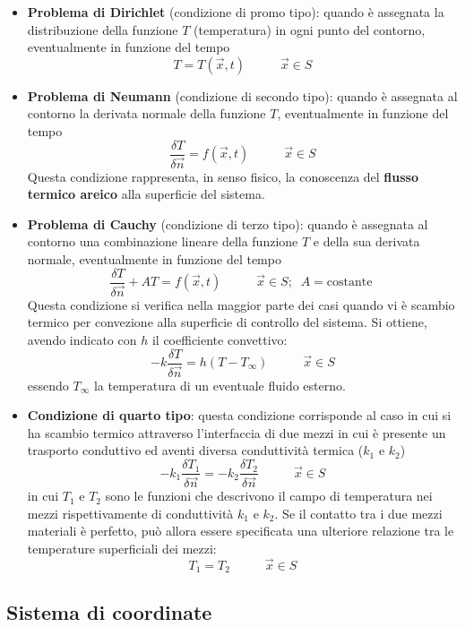 \begin{itemize}
    \item \textbf{Problema di Dirichlet} (condizione di promo tipo): quando è assegnata la distribuzione della funzione $T$ (temperatura) in ogni punto del contorno, eventualmente in funzione del tempo
    \[
        T = T(\vec{x},t) \;\;\;\;\;\;\;\;\;\;\vec{x} \in S
    \]
    \item \textbf{Problema di Neumann} (condizione di secondo tipo): quando è assegnata al contorno la derivata normale della funzione $T$, eventualmente in funzione del tempo
    \[
        \frac{\delta T}{\delta \vec{n}} = f(\vec{x},t) \;\;\;\;\;\;\;\;\;\; \vec{x} \in S
    \]
    Questa condizione rappresenta, in senso fisico, la conoscenza del \textbf{flusso termico areico} alla superficie del sistema.
    \item \textbf{Problema di Cauchy} (condizione di terzo tipo): quando è assegnata al contorno una combinazione lineare della funzione $T$ e della sua derivata normale, eventualmente in funzione del tempo
    \[
        \frac{\delta T}{\delta \vec{n}} + A T = f(\vec{x}, t) \;\;\;\;\;\;\;\;\;\; \vec{x} \in S; \;\; A = \text{costante}\;
    \]
    Questa condizione si verifica nella maggior parte dei casi quando vi è scambio termico per convezione alla superficie di controllo del sistema. Si ottiene, avendo indicato con $h$ il coefficiente convettivo:
    \[
        -k \frac{\delta T}{\delta \vec{n}} = h (T-T_{\infty}) \;\;\;\;\;\;\;\;\;\; \vec{x} \in S
    \]
    essendo $T_{\infty}$ la temperatura di un eventuale fluido esterno.
    \item \textbf{Condizione di quarto tipo}: questa condizione corrisponde al caso in cui si ha scambio termico attraverso l'interfaccia di due mezzi in cui è presente un trasporto conduttivo ed aventi diversa conduttività termica ($k_1$ e $k_2$)
    \[
        -k_1 \frac{\delta T_1}{\delta \vec{n}} = -k_2 \frac{\delta T_2}{\delta \vec{n}} \;\;\;\;\;\;\;\;\;\; \vec{x} \in S
    \]
    in cui $T_1$ e $T_2$ sono le funzioni che descrivono il campo di temperatura nei mezzi rispettivamente di conduttività $k_1$ e $k_2$.\newline
    \newline
    Se il contatto tra i due mezzi materiali è perfetto, può allora essere specificata una ulteriore relazione tra le temperature superficiali dei mezzi:
    \[
        T_1 = T_2 \;\;\;\;\;\;\;\;\;\; \vec{x} \in S
    \]
\end{itemize}
\subsection{Sistema di coordinate}
